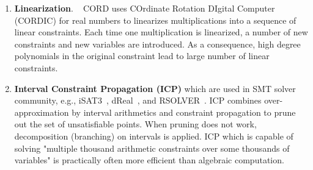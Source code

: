 \begin{enumerate}
\item \textbf{Linearization}. ~
CORD \cite{cordic} uses COrdinate Rotation DIgital Computer (CORDIC) for real numbers to linearizes multiplications into a sequence of linear constraints. Each time one multiplication is linearized, a number of new constraints and new variables are introduced. As a consequence, high degree polynomials in the original constraint lead to large number of linear constraints. 

\item \textbf{Interval Constraint Propagation (ICP)} 
which are used in SMT solver community, e.g., iSAT3~\cite{isat}, 
dReal~\cite{dRealCADE13}, and RSOLVER~\cite{rsolver}. 
ICP combines over-approximation by interval arithmetics and constraint propagation to prune out the set of unsatisfiable points. When pruning does not work, decomposition (branching) on intervals is applied. 
ICP which is capable of solving "multiple thousand arithmetic constraints over some thousands of variables" \cite{isat} is practically often more efficient than algebraic computation.
\end{enumerate}

